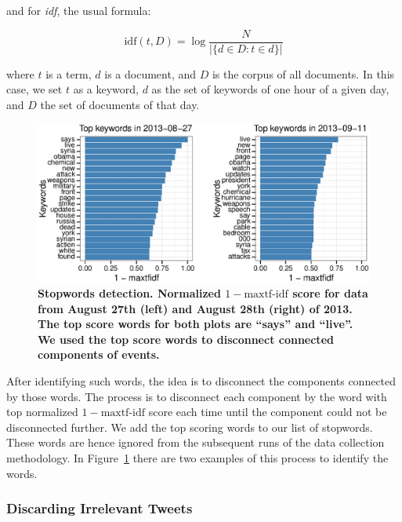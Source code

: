 \documentclass[10pt,letterpaper]{article}
\begin{document}
and for \emph{idf}, the usual formula:

\begin{equation}
  \text{idf}(t,D) = \log\frac{N}{|\{d \in D : t \in d\}|}
\end{equation}

where $t$ is a term, $d$ is a document, and $D$ is the corpus of all
documents. In this case, we set $t$ as a keyword, $d$ as the set of
keywords of one hour of a given day, and $D$ the set of documents of
that day.

\begin{figure}
  \begin{center}
    \includegraphics[width=\textwidth]{figures_SI/Plots_from_data/stopwords1}
    \caption[Stopwords detection.]{\textbf{Stopwords detection.
        Normalized $1-\text{maxtf-idf}$ score for data from August
        27th (left) and August 28th (right) of 2013. The top score
        words for both plots are ``says'' and ``live''. We used the
        top score words to disconnect connected components of
        events.}}
    \label{fig:stopwords}
  \end{center}
\end{figure}


After identifying such words, the idea is to disconnect the
components connected by those words. The process is to disconnect
each component by the word with top normalized $1-\text{maxtf-idf}$
score each time until the component could not be disconnected further.
We add the top scoring words to our list of stopwords.
These words are hence ignored from the subsequent runs of the data collection methodology.
In Figure~\ref{fig:stopwords} there are two examples of this process
to identify the words.
\subsubsection{Discarding Irrelevant Tweets}
\label{subsubsec:discarding_irrelevant_tweets}
\end{document}
